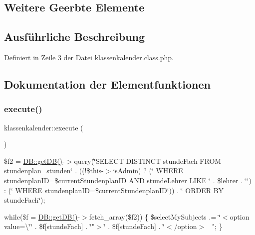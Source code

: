 \subsection*{Weitere Geerbte Elemente}


\subsection{Ausführliche Beschreibung}


Definiert in Zeile 3 der Datei klassenkalender.\+class.\+php.



\subsection{Dokumentation der Elementfunktionen}
\mbox{\label{classklassenkalender_a6875035fc1f29e41d3e98dbf295d97b0}} 
\subsubsection{\texorpdfstring{execute()}{execute()}}
{\footnotesize\ttfamily klassenkalender\+::execute (\begin{DoxyParamCaption}{ }\end{DoxyParamCaption})}

\$f2 = \mbox{\hyperlink{class_d_b_a1f39c0489afad64328534850308fc9a9}{D\+B\+::get\+D\+B()}}-\/$>$query(\char`\"{}\+S\+E\+L\+E\+C\+T D\+I\+S\+T\+I\+N\+C\+T stunde\+Fach F\+R\+O\+M stundenplan\+\_\+stunden\char`\"{} . ((!\$this-\/$>$is\+Admin) ? (\char`\"{} W\+H\+E\+R\+E stundenplan\+I\+D=\textquotesingle{}\$current\+Stundenplan\+I\+D\textquotesingle{} A\+N\+D stunde\+Lehrer L\+I\+K\+E \textquotesingle{}\char`\"{} . \$lehrer . \char`\"{}\textquotesingle{}\char`\"{}) \+: (\char`\"{} W\+H\+E\+R\+E stundenplan\+I\+D=\textquotesingle{}\$current\+Stundenplan\+I\+D\textquotesingle{}\char`\"{})) . \char`\"{} O\+R\+D\+E\+R B\+Y stunde\+Fach\char`\"{});

while(\$f = \mbox{\hyperlink{class_d_b_a1f39c0489afad64328534850308fc9a9}{D\+B\+::get\+D\+B()}}-\/$>$fetch\+\_\+array(\$f2)) \{ \$select\+My\+Subjects .= \char`\"{}$<$option value=\textbackslash{}\char`\"{}\char`\"{} . \$f\mbox{[}\textquotesingle{}stunde\+Fach\textquotesingle{}\mbox{]} . \char`\"{}"$>$\char`\"{} . \$f\mbox{[}\textquotesingle{}stunde\+Fach\textquotesingle{}\mbox{]} . \char`\"{}$<$/option$>$~\newline
"; \} 

